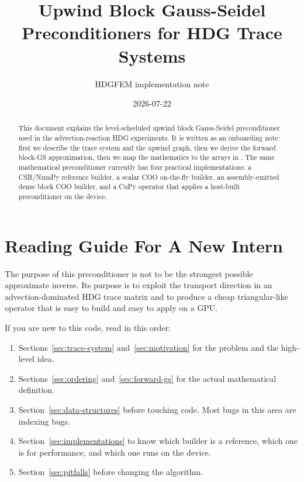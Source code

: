\documentclass[11pt]{article}
\title{Upwind Block Gauss-Seidel Preconditioners for HDG Trace Systems}
\author{HDGFEM implementation note}
\date{2026-07-22}
\newcommand{\code}[1]{\texttt{\detokenize{#1}}}
\begin{document}
\maketitle

\begin{abstract}
This document explains the level-scheduled upwind block Gauss-Seidel
preconditioner used in the advection-reaction HDG experiments.  It is written
as an onboarding note: first we describe the trace system and the upwind graph,
then we derive the forward block-GS approximation, then we map the mathematics
to the arrays in \code{hdgfem}.  The same mathematical preconditioner currently
has four practical implementations: a CSR/NumPy reference builder, a scalar COO
on-the-fly builder, an assembly-emitted dense block COO builder, and a CuPy
operator that applies a host-built preconditioner on the device.
\end{abstract}

\tableofcontents

\section{Reading Guide For A New Intern}

The purpose of this preconditioner is not to be the strongest possible
approximate inverse.  Its purpose is to exploit the transport direction in an
advection-dominated HDG trace matrix and to produce a cheap triangular-like
operator that is easy to build and easy to apply on a GPU.

If you are new to this code, read in this order:
\begin{enumerate}[nosep]
  \item Sections~\ref{sec:trace-system} and~\ref{sec:motivation} for the
        problem and the high-level idea.
  \item Sections~\ref{sec:ordering} and~\ref{sec:forward-gs} for the actual
        mathematical definition.
  \item Section~\ref{sec:data-structures} before touching code.  Most bugs in
        this area are indexing bugs.
  \item Section~\ref{sec:implementations} to know which builder is a reference,
        which one is for performance, and which one runs on the device.
  \item Section~\ref{sec:pitfalls} before changing the algorithm.
\end{enumerate}
\end{document}
